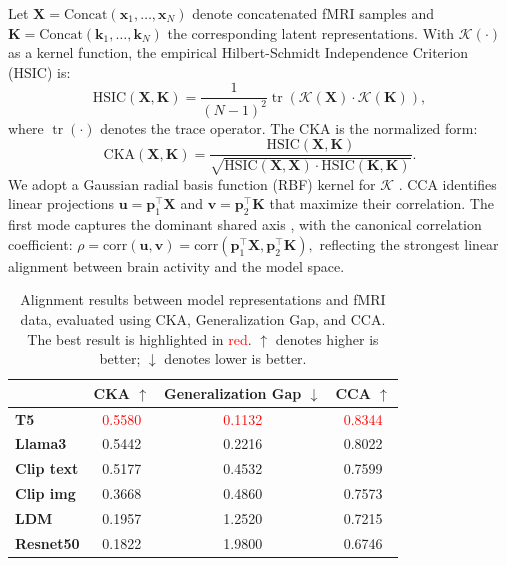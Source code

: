Let \( \mathbf{X} = \text{Concat}(\mathbf{x}_1, \ldots, \mathbf{x}_N) \) denote concatenated fMRI samples and \( \mathbf{K} = \text{Concat}(\mathbf{k}_1, \ldots, \mathbf{k}_N) \) the corresponding latent representations. With \( \mathcal{K}(\cdot) \) as a kernel function, the empirical Hilbert-Schmidt Independence Criterion (HSIC) is:
\[
\text{HSIC}(\mathbf{X}, \mathbf{K}) = \frac{1}{(N - 1)^2} \operatorname{tr} \left( \mathcal{K}(\mathbf{X}) \cdot \mathcal{K}(\mathbf{K}) \right),
\]
where \( \operatorname{tr}(\cdot) \) denotes the trace operator. The CKA is the normalized form:
\[
\text{CKA}(\mathbf{X}, \mathbf{K}) = \frac{\text{HSIC}(\mathbf{X}, \mathbf{K})}{\sqrt{\text{HSIC}(\mathbf{X}, \mathbf{X}) \cdot \text{HSIC}(\mathbf{K}, \mathbf{K})}}.
\]
We adopt a Gaussian radial basis function (RBF) kernel for \( \mathcal{K} \) \citep{alvarez2022gaussian, cortes2012algorithms}. CCA identifies linear projections $\mathbf{u} = \mathbf{p}_1^\top \mathbf{X}$ and $\mathbf{v} = \mathbf{p}_2^\top \mathbf{K}$ that maximize their correlation. The first mode captures the dominant shared axis \citep{wang2020finding}, with the canonical correlation coefficient: $\rho = \text{corr}(\mathbf{u}, \mathbf{v}) = \text{corr}(\mathbf{p}_1^\top \mathbf{X}, \mathbf{p}_2^\top \mathbf{K}),$ reflecting the strongest linear alignment between brain activity and the model space.
\begin{table}
\centering
    \caption{\small Alignment results between model representations and fMRI data, evaluated using CKA, Generalization Gap, and CCA. The best result is highlighted in \textcolor{red}{red}. $\uparrow$ denotes higher is better; $\downarrow$ denotes lower is better.}
    \vspace{0.2cm}

    \begin{tabular}{lccc}
    \toprule
               & \textbf{CKA} $\uparrow$   & \textbf{Generalization Gap}  $\downarrow$ & \textbf{CCA} $\uparrow$\\
    \midrule
    \textbf{T5}    & \textcolor{red}{0.5580}  & \textcolor{red}{0.1132}             &  \textcolor{red}{0.8344}   \\
    \textbf{Llama3} & 0.5442 & 0.2216             &  0.8022   \\
    \textbf{Clip text}  & 0.5177 & 0.4532             &   0.7599  \\
    \textbf{Clip img}   & 0.3668 & 0.4860                &   0.7573  \\
    \textbf{LDM}        & 0.1957 & 1.2520              & 0.7215    \\
    \textbf{Resnet50}     & 0.1822 & 1.9800               &  0.6746  \\
    \bottomrule

    \end{tabular}
    \label{tb_similarity}

\end{table}

